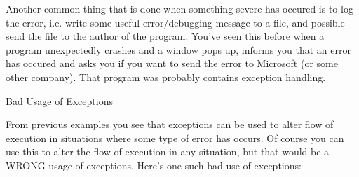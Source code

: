 \documentclass[
]{article}
\begin{document}
Another common thing that is done when something severe has occured is
to log the error, i.e. write some useful error/debugging message to a
file, and possible send the file to the author of the program. You've
seen this before when a program unexpectedly crashes and a window pops
up, informs you that an error has occured and asks you if you want to
send the error to Microsoft (or some other company). That program was
probably contains exception handling.

Bad Usage of Exceptions

From previous examples you see that exceptions can be used to alter flow
of execution in situations where some type of error has occurs. Of
course you can use this to alter the flow of execution in any situation,
but that would be a WRONG usage of exceptions. Here's one such bad use
of exceptions:
\end{document}
